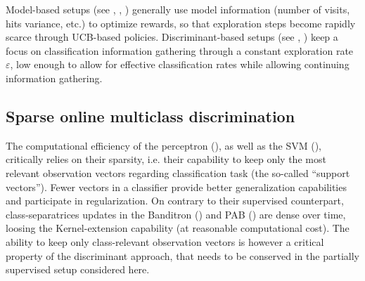 \documentclass[preprint,12pt,authoryear]{elsarticle}
\begin{document}
Model-based setups (see \cite{lai1985asymptotically}, \cite{auer2003nonstochastic}, \cite{crammer2013multiclass}) generally use model information (number of visits, hits variance, etc.) to optimize rewards, so that exploration steps become rapidly scarce through UCB-based policies. 
Discriminant-based setups (see \cite{kakade2008efficient}, \cite{zhong2015esann}) keep a focus on classification information gathering through  
a constant exploration rate $\varepsilon$, low enough to allow for effective classification rates while allowing continuing information gathering.



\subsection{Sparse online multiclass discrimination}\label{sec:sparse-online-multiclass-discrimination}

%



The computational efficiency of the perceptron (\cite{rosenblatt1958perceptron}), as well as the SVM (\cite{vapnik1998statistical}),  critically relies on their sparsity, i.e. their capability to keep only the most relevant observation vectors regarding classification task (the so-called ``support vectors''). Fewer vectors in a classifier provide better generalization capabilities and participate in regularization.
On contrary to their supervised counterpart, class-separatrices updates in the Banditron (\cite{kakade2008efficient}) and PAB (\cite{zhong2015esann}) are dense over time, loosing the Kernel-extension capability (at reasonable computational cost). 
The ability to keep only class-relevant observation vectors is however a critical property of the discriminant approach, that needs to be conserved in the partially supervised setup considered here. 
\end{document}
